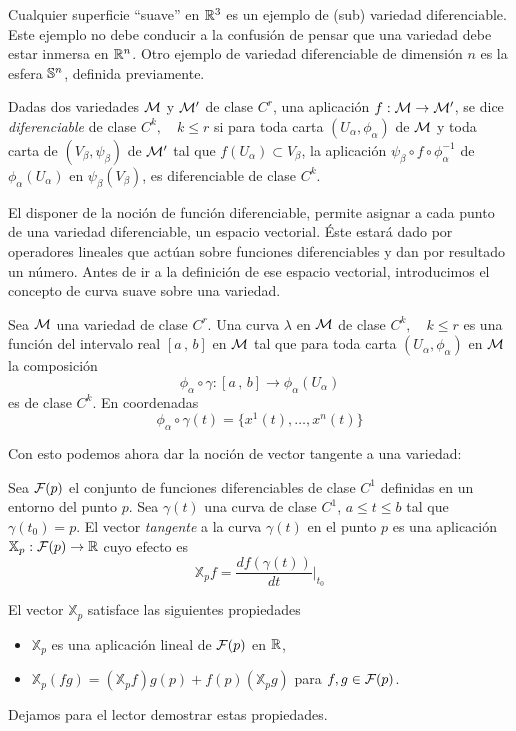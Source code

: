 Cualquier  superficie ``suave''  en $\mathbb{R}^3$  es un  ejemplo de  (sub) variedad
diferenciable. Este ejemplo no debe conducir  a la confusi\'on de pensar que una
variedad debe estar inmersa en $\mathbb{R}^n$. Otro ejemplo de variedad diferenciable
de dimensi\'on $n$ es la esfera $\mathbb{S}^n$, definida previamente.

\begin{definicion}
  Dadas  dos variedades  $\mathcal{M}$ y  $\mathcal{M}'$ de  clase $C^r$,  una  aplicaci\'on $f:\mathcal{M}
  \rightarrow \mathcal{M}' $,  se dice {\it diferenciable} de clase $C^k,  \quad k \le r$
  si para  toda carta  $\left( U_\alpha  , \phi_\alpha \right)$  de $\mathcal{M}$  y toda
  carta  de $\left(  V_\beta ,  \psi_\beta \right)$  de $\mathcal{M}'$  tal  que $f\left(
    U_\alpha \right) \subset V_\beta$, la aplicaci\'on $\psi_\beta \circ f \circ
  \phi_\alpha^{-1}$ de $\phi_\alpha\left( U_\alpha \right)$ en $\psi_\beta\left(
    V_\beta \right)$, es diferenciable de clase $C^k$.
\end{definicion}

El disponer  de la noci\'on de  funci\'on diferenciable, permite  asignar a cada
punto de una variedad diferenciable,  un espacio vectorial. \'Este estar\'a dado
por operadores  lineales que act\'uan  sobre funciones diferenciables y  dan por
resultado un n\'umero.  Antes de ir a la definici\'on  de ese espacio vectorial,
introducimos el concepto de curva suave sobre una variedad.
%
\begin{definicion}
  Sea $\mathcal{M}$  una variedad de  clase $C^r$. Una  curva $\lambda$ en $\mathcal{M}$  de clase
  $C^k, \quad k  \le r$ es una funci\'on  del intervalo real $[a \, ,  \, b]$ en
  $\mathcal{M}$ tal que  para toda carta $\left( U_\alpha ,  \phi_\alpha \right)$ en $\mathcal{M}$
  la composici\'on
  \[
  \phi_\alpha \circ \gamma: [a \, , \, b] \rightarrow \phi_\alpha\left( U_\alpha
  \right)
  \]
  es de clase $C^k$. En coordenadas
  \[
  \phi_\alpha \circ \gamma (t) = \{ x^1(t) , \ldots , x^n(t) \}
  \]
\end{definicion}
%
Con esto podemos ahora dar la noci\'on de vector tangente a una variedad:
%
\begin{definicion}
  Sea $\mathcal{F}(p)$ el  conjunto de funciones diferenciables de  clase $C^1$ definidas
  en un entorno del punto $p$.  Sea $\gamma(t)$ una curva de clase $C^1$, $a \le
  t  \le b$  tal que  $\gamma(t_0) =  p$. El  vector {\it  tangente} a  la curva
  $\gamma(t)$ en el punto $p$ es una aplicaci\'on $\mathbb{X}_p : \mathcal{F}(p) \rightarrow \mathbb{R}$
  cuyo efecto es
  \[
  \mathbb{X}_p f = \frac{df(\gamma (t))}{dt} |_{t_0}
  \]
\end{definicion}
%
El vector $\mathbb{X}_p$ satisface las siguientes propiedades
%
\begin{itemize}
 \item $\mathbb{X}_p$ es una aplicaci\'on lineal de $\mathcal{F}(p)$ en $\mathbb{R}$,
 \item  $\mathbb{X}_p(fg) =  \left( \mathbb{X}_p  f \right)  g(p) +  f(p) \left(
     \mathbb{X}_p g \right)$ para $f , g \in \mathcal{F}(p)$.
\end{itemize}
%
Dejamos para el lector demostrar estas propiedades.

